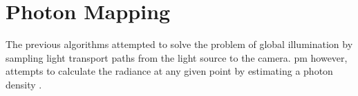 


\section{Photon Mapping}

The previous algorithms attempted to solve the problem of global illumination by sampling light transport paths from the light source to the camera. \gls{pm} however, attempts to calculate the radiance at any given point by estimating a photon density \citep{Jensen}.

